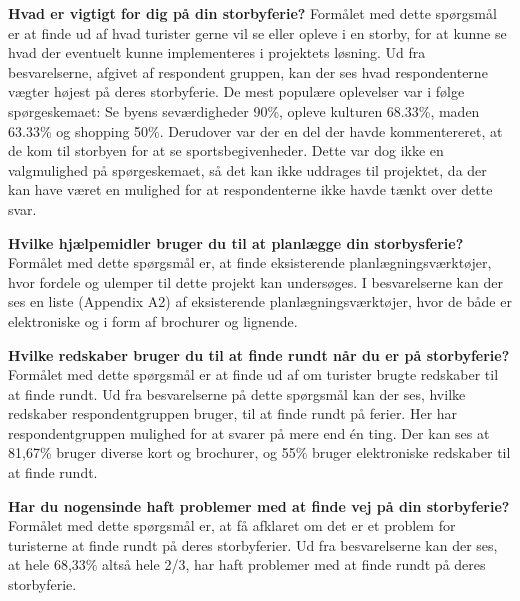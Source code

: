 \textbf{Hvad er vigtigt for dig på din storbyferie?}\newline
Formålet med dette spørgsmål er at finde ud af hvad turister gerne vil se eller opleve i en storby, for at kunne se hvad der eventuelt kunne implementeres i projektets løsning.\newline
Ud fra besvarelserne, afgivet af respondent gruppen, kan der ses hvad respondenterne vægter højest på deres storbyferie. De mest populære oplevelser var i følge spørgeskemaet: Se byens seværdigheder 90\%, opleve kulturen 68.33\%, maden 63.33\% og shopping 50\%. Derudover var der en del der havde kommentereret, at de kom til storbyen for at se sportsbegivenheder. Dette var dog ikke en valgmulighed på spørgeskemaet, så det kan ikke uddrages til projektet, da der kan have været en mulighed for at respondenterne ikke havde tænkt over dette svar.\newline

\textbf{Hvilke hjælpemidler bruger du til at planlægge din storbysferie?}\newline
Formålet med dette spørgsmål er, at finde eksisterende planlægningsværktøjer, hvor fordele og ulemper til dette projekt kan undersøges.\newline 
I besvarelserne kan der ses en liste (Appendix A2) af eksisterende planlægningsværktøjer, hvor de både er elektroniske og i form af brochurer og lignende.\newline

\textbf{Hvilke redskaber bruger du til at finde rundt når du er på storbyferie?}\newline
Formålet med dette spørgsmål er at finde ud af om turister brugte redskaber til at finde rundt.\newline 
Ud fra besvarelserne på dette spørgsmål kan der ses, hvilke redskaber respondentgruppen bruger, til at finde rundt på ferier. Her har respondentgruppen mulighed for at svarer på mere end én ting. Der kan ses at 81,67\% bruger diverse kort og brochurer, og 55\% bruger elektroniske redskaber til at finde rundt. \newline

\textbf{Har du nogensinde haft problemer med at finde vej på din storbyferie?}\newline
Formålet med dette spørgsmål er, at få afklaret om det er et problem for turisterne at finde rundt på deres storbyferier.\newline
Ud fra besvarelserne kan der ses, at hele 68,33\% altså hele 2/3, har haft problemer med at finde rundt på deres storbyferie.\newline

